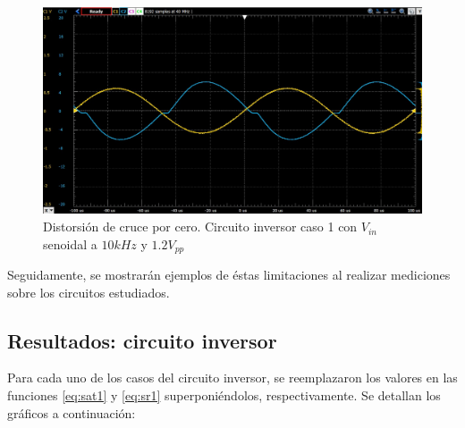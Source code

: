 \begin{figure}[H]
	\centering
	\includegraphics[scale=0.3]{./Imagenes/zeroCrossover600mV10kHz.jpg}
	\caption{Distorsión de cruce por cero. Circuito inversor caso 1 con $V_{in}$ senoidal a $10kHz$ y $1.2V_{pp}$}
	\label{fig:circinvcaso1}
\end{figure}

Seguidamente, se mostrarán ejemplos de éstas limitaciones al realizar mediciones sobre los circuitos estudiados. 

\subsection{Resultados: circuito inversor}


Para cada uno de los casos del circuito inversor, se reemplazaron los valores en las funciones \ref{eq:sat1} y \ref{eq:sr1} superponiéndolos, respectivamente. Se detallan los gráficos a continuación:


